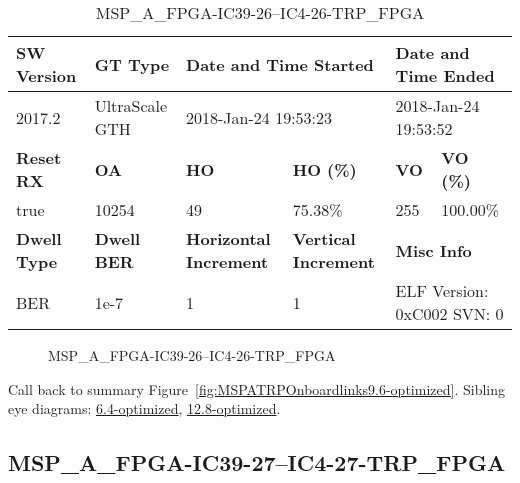 \begin{table}[h]
\centering
\caption{MSP\_A\_FPGA-IC39-26--IC4-26-TRP\_FPGA}
\label{tab:MSPAFPGAIC3926IC426TRPFPGA9.6-optimized}
\begin{tabular}{@{}|l|l|l|l|l|l|@{}}
\toprule
\textbf{SW Version}                & \textbf{GT Type}   & \multicolumn{2}{l|}{\textbf{Date and Time Started}}            & \multicolumn{2}{l|}{\textbf{Date and Time Ended}}        \\ \midrule
2017.2                       & UltraScale GTH          & \multicolumn{2}{l|}{2018-Jan-24 19:53:23}                   & \multicolumn{2}{l|}{2018-Jan-24 19:53:52}               \\ \midrule
\textbf{Reset RX}                  & \textbf{OA} & \textbf{HO}   & \textbf{HO (\%)} & \textbf{VO} & \textbf{VO (\%)} \\ \midrule
true & 10254        & 49          & 75.38\%        & 255        & 100.00\%       \\ \midrule
\textbf{Dwell Type}                & \textbf{Dwell BER} & \textbf{Horizontal Increment} & \textbf{Vertical Increment}    & \multicolumn{2}{l|}{\textbf{Misc Info}}                  \\ \midrule
BER                            & 1e-7        & 1        & 1           & \multicolumn{2}{l|}{ELF Version: 0xC002 SVN: 0}                         \\ \bottomrule
\end{tabular}
\end{table}

\begin{figure}[h]
\caption{MSP\_A\_FPGA-IC39-26--IC4-26-TRP\_FPGA} \label{fig:MSPAFPGAIC3926IC426TRPFPGA9.6-optimized}
\end{figure}

Call back to summary Figure~\ref{fig:MSPATRPOnboardlinks9.6-optimized}.
Sibling eye diagrams: \hyperref[sec:MSPAFPGAIC3926IC426TRPFPGA6.4-optimized]{6.4-optimized}, \hyperref[sec:MSPAFPGAIC3926IC426TRPFPGA12.8-optimized]{12.8-optimized}.

\clearpage
\newpage


\subsection{MSP\_A\_FPGA-IC39-27--IC4-27-TRP\_FPGA}\label{sec:MSPAFPGAIC3927IC427TRPFPGA9.6-optimized}

